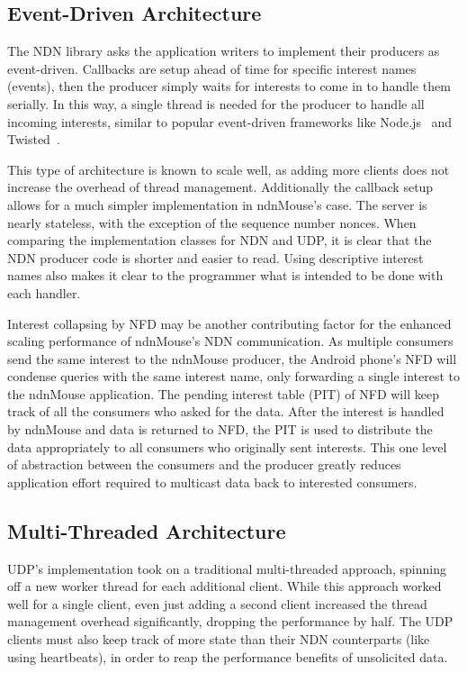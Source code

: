 \documentclass{sig-alternate}
\renewcommand\_{\textunderscore\allowbreak}  %
\begin{document}
\subsection{Event-Driven Architecture}
The NDN library asks the application writers to implement their producers as event-driven. Callbacks are setup ahead of time for specific interest names (events), then the producer simply waits for interests to come in to handle them serially. In this way, a single thread is needed for the producer to handle all incoming interests, similar to popular event-driven frameworks like Node.js~\cite{nodejs} and Twisted~\cite{twisted}. 

This type of architecture is known to scale well, as adding more clients does not increase the overhead of thread management. Additionally the callback setup allows for a much simpler implementation in ndnMouse's case. The server is nearly stateless, with the exception of the sequence number nonces. When comparing the implementation classes for NDN and UDP, it is clear that the NDN producer code is shorter and easier to read. Using descriptive interest names also makes it clear to the programmer what is intended to be done with each handler.

Interest collapsing by NFD may be another contributing factor for the enhanced scaling performance of ndnMouse's NDN communication. As multiple consumers send the same interest to the ndnMouse producer, the Android phone's NFD will condense queries with the same interest name, only forwarding a single interest to the ndnMouse application. The pending interest table (PIT) of NFD will keep track of all the consumers who asked for the data. After the interest is handled by ndnMouse and data is returned to NFD, the PIT is used to distribute the data appropriately to all consumers who originally sent interests. This one level of abstraction between the consumers and the producer greatly reduces application effort required to multicast data back to interested consumers. 

\subsection{Multi-Threaded Architecture}
UDP's implementation took on a traditional multi-threaded approach, spinning off a new worker thread for each additional client. While this approach worked well for a single client, even just adding a second client increased the thread management overhead significantly, dropping the performance by half. The UDP clients must also keep track of more state than their NDN counterparts (like using heartbeats), in order to reap the performance benefits of unsolicited data.
\end{document}
